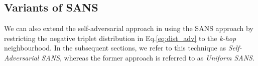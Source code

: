 \subsection{Variants of SANS}

We can also extend the self-adversarial approach in \cite{sun2019rotate} using the SANS approach by restricting the negative triplet distribution in Eq.\ref{eq:dist_adv} to the \emph{k-hop} neighbourhood. In the subsequent sections, we refer to this technique as \emph{Self-Adversarial SANS}, whereas the former approach is referred to as \emph{Uniform SANS}. 

